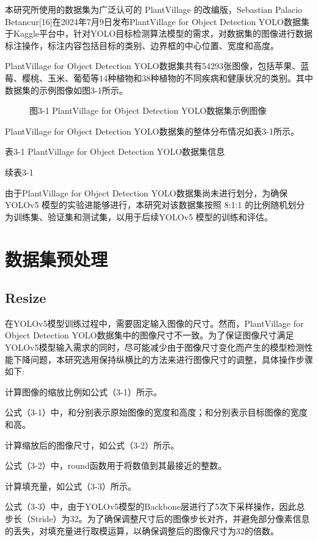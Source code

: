 \documentclass[12pt, a4paper, twoside]{ctexart}
\begin{document}
本研究所使用的数据集为广泛认可的 PlantVillage 的改编版，Sebastian Palacio Betancur[16]在2024年7月9日发布PlantVillage for Object Detection YOLO数据集于Kaggle平台中，针对YOLO目标检测算法模型的需求，对数据集的图像进行数据标注操作，标注内容包括目标的类别、边界框的中心位置、宽度和高度。

PlantVillage for Object Detection YOLO数据集共有54293张图像，包括苹果、蓝莓、樱桃、玉米、葡萄等14种植物和38种植物的不同疾病和健康状况的类别。其中数据集的示例图像如图3-1所示。


\begin{figure}[htbp]
\centering
\caption{图3-1 PlantVillage for Object Detection YOLO数据集示例图像}
\end{figure}

PlantVillage for Object Detection YOLO数据集的整体分布情况如表3-1所示。

表3-1 PlantVillage for Object Detection YOLO数据集信息

续表3-1

由于PlantVillage for Object Detection YOLO数据集尚未进行划分，为确保YOLOv5 模型的实验进能够进行，本研究对该数据集按照 8:1:1 的比例随机划分为训练集、验证集和测试集，以用于后续YOLOv5 模型的训练和评估。


\section{数据集预处理}


\subsection{Resize}

在YOLOv5模型训练过程中，需要固定输入图像的尺寸。然而，PlantVillage for Object Detection YOLO数据集中的图像尺寸不一致。为了保证图像尺寸满足YOLOv5模型输入需求的同时，尽可能减少由于图像尺寸变化而产生的模型检测性能下降问题，本研究选用保持纵横比的方法来进行图像尺寸的调整，具体操作步骤如下:

计算图像的缩放比例如公式（3-1）所示。

公式（3-1）中，和分别表示原始图像的宽度和高度；和分别表示目标图像的宽度和高。

计算缩放后的图像尺寸，如公式（3-2）所示。

公式（3-2）中，round函数用于将数值到其最接近的整数。

计算填充量，如公式（3-3）所示。

公式（3-3）中，由于YOLOv5模型的Backbone层进行了5次下采样操作，因此总步长（Stride）为32。为了确保调整尺寸后的图像步长对齐，并避免部分像素信息的丢失，对填充量进行取模运算，以确保调整后的图像尺寸为32的倍数。
\end{document}
